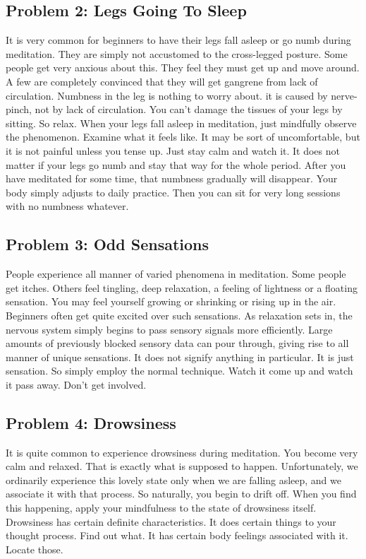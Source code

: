 \subsection*{Problem 2: Legs Going To Sleep}
 It is very common for beginners to have their legs
fall asleep or go numb during meditation. They are simply not accustomed to the
cross-legged posture. Some people get very anxious about this. They feel they
must get up and move around. A few are completely convinced that they will get
gangrene from lack of circulation. Numbness in the leg is nothing to worry
about. it is caused by nerve-pinch, not by lack of circulation. You can't damage
the tissues of your legs by sitting. So relax. When your legs fall asleep in
meditation, just mindfully observe the phenomenon. Examine what it feels like.
It may be sort of uncomfortable, but it is not painful unless you tense up. Just
stay calm and watch it. It does not matter if your legs go numb and stay that
way for the whole period. After you have meditated for some time, that numbness
gradually will disappear. Your body simply adjusts to daily practice. Then you
can sit for very long sessions with no numbness whatever.

\subsection*{Problem 3: Odd Sensations }
People experience all manner of varied phenomena in
meditation. Some people get itches. Others feel tingling, deep relaxation, a
feeling of lightness or a floating sensation. You may feel yourself growing or
shrinking or rising up in the air. Beginners often get quite excited over such
sensations. As relaxation sets in, the nervous system simply begins to pass
sensory signals more efficiently. Large amounts of previously blocked sensory
data can pour through, giving rise to all manner of unique sensations. It does
not signify anything in particular. It is just sensation. So simply employ the
normal technique. Watch it come up and watch it pass away. Don't get involved.

\subsection{Problem 4: Drowsiness} It is quite common to experience drowsiness during
meditation. You become very calm and relaxed. That is exactly what is supposed
to happen. Unfortunately, we ordinarily experience this lovely state only when
we are falling asleep, and we associate it with that process. So naturally, you
begin to drift off. When you find this happening, apply your mindfulness to the
state of drowsiness itself. Drowsiness has certain definite characteristics. It
does certain things to your thought process. Find out what. It has certain body
feelings associated with it. Locate those.

